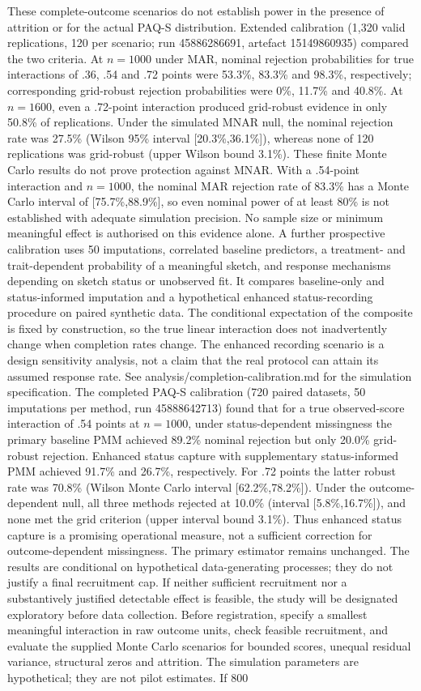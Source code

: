 \documentclass[11pt,a4paper]{article}
\begin{document}
These complete-outcome scenarios do not establish power in the presence of attrition or for the actual PAQ-S distribution. Extended calibration (1,320 valid replications, 120 per scenario; run 45886286691, artefact 15149860935) compared the two criteria. At \(n=1000\) under MAR, nominal rejection probabilities for true interactions of .36, .54 and .72 points were 53.3\%, 83.3\% and 98.3\%, respectively; corresponding grid-robust rejection probabilities were 0\%, 11.7\% and 40.8\%. At \(n=1600\), even a .72-point interaction produced grid-robust evidence in only 50.8\% of replications. Under the simulated MNAR null, the nominal rejection rate was 27.5\% (Wilson 95\% interval [20.3\%,36.1\%]), whereas none of 120 replications was grid-robust (upper Wilson bound 3.1\%). These finite Monte Carlo results do not prove protection against MNAR. With a .54-point interaction and \(n=1000\), the nominal MAR rejection rate of 83.3\% has a Monte Carlo interval of [75.7\%,88.9\%], so even nominal power of at least 80\% is not established with adequate simulation precision. No sample size or minimum meaningful effect is authorised on this evidence alone. A further prospective calibration uses 50 imputations, correlated baseline predictors, a treatment- and trait-dependent probability of a meaningful sketch, and response mechanisms depending on sketch status or unobserved fit. It compares baseline-only and status-informed imputation and a hypothetical enhanced status-recording procedure on paired synthetic data. The conditional expectation of the composite is fixed by construction, so the true linear interaction does not inadvertently change when completion rates change. The enhanced recording scenario is a design sensitivity analysis, not a claim that the real protocol can attain its assumed response rate. See analysis/completion-calibration.md for the simulation specification. The completed PAQ-S calibration (720 paired datasets, 50 imputations per method, run 45888642713) found that for a true observed-score interaction of .54 points at \(n=1000\), under status-dependent missingness the primary baseline PMM achieved 89.2\% nominal rejection but only 20.0\% grid-robust rejection. Enhanced status capture with supplementary status-informed PMM achieved 91.7\% and 26.7\%, respectively. For .72 points the latter robust rate was 70.8\% (Wilson Monte Carlo interval [62.2\%,78.2\%]). Under the outcome-dependent null, all three methods rejected at 10.0\% (interval [5.8\%,16.7\%]), and none met the grid criterion (upper interval bound 3.1\%). Thus enhanced status capture is a promising operational measure, not a sufficient correction for outcome-dependent missingness. The primary estimator remains unchanged. The results are conditional on hypothetical data-generating processes; they do not justify a final recruitment cap. If neither sufficient recruitment nor a substantively justified detectable effect is feasible, the study will be designated exploratory before data collection. Before registration, specify a smallest meaningful interaction in raw outcome units, check feasible recruitment, and evaluate the supplied Monte Carlo scenarios for bounded scores, unequal residual variance, structural zeros and attrition. The simulation parameters are hypothetical; they are not pilot estimates. If 800 
\end{document}
